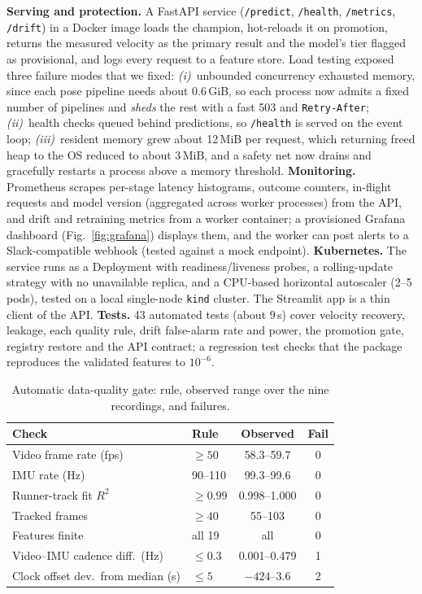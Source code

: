 \documentclass[conference]{IEEEtran}
\begin{document}
\textbf{Serving and protection.} A FastAPI service (\texttt{/predict}, \texttt{/health}, \texttt{/metrics}, \texttt{/drift}) in a Docker image loads the champion, hot-reloads it on promotion, returns the measured velocity as the primary result and the model's tier flagged as provisional, and logs every request to a feature store. Load testing exposed three failure modes that we fixed: \emph{(i)}~unbounded concurrency exhausted memory, since each pose pipeline needs about 0.6\,GiB, so each process now admits a fixed number of pipelines and \emph{sheds} the rest with a fast 503 and \texttt{Retry-After}; \emph{(ii)}~health checks queued behind predictions, so \texttt{/health} is served on the event loop; \emph{(iii)}~resident memory grew about 12\,MiB per request, which returning freed heap to the OS reduced to about 3\,MiB, and a safety net now drains and gracefully restarts a process above a memory threshold. \textbf{Monitoring.} Prometheus scrapes per-stage latency histograms, outcome counters, in-flight requests and model version (aggregated across worker processes) from the API, and drift and retraining metrics from a worker container; a provisioned Grafana dashboard (Fig.~\ref{fig:grafana}) displays them, and the worker can post alerts to a Slack-compatible webhook (tested against a mock endpoint). \textbf{Kubernetes.} The service runs as a Deployment with readiness/liveness probes, a rolling-update strategy with no unavailable replica, and a CPU-based horizontal autoscaler (2--5 pods), tested on a local single-node \texttt{kind} cluster. The Streamlit app is a thin client of the API.
\textbf{Tests.} 43 automated tests (about 9\,s) cover velocity recovery, leakage, each quality rule, drift false-alarm rate and power, the promotion gate, registry restore and the API contract; a regression test checks that the package reproduces the validated features to $10^{-6}$.

\begin{table}[t]
\caption{Automatic data-quality gate: rule, observed range over the nine recordings, and failures.}
\label{tab:qa}
\centering\footnotesize
\setlength{\tabcolsep}{3pt}
\begin{tabular}{@{}llcc@{}}
\toprule
Check & Rule & Observed & Fail\\
\midrule
Video frame rate (fps) & $\geq50$ & 58.3--59.7 & 0\\
IMU rate (Hz) & 90--110 & 99.3--99.6 & 0\\
Runner-track fit $R^2$ & $\geq0.99$ & 0.998--1.000 & 0\\
Tracked frames & $\geq40$ & 55--103 & 0\\
Features finite & all 19 & all & 0\\
Video--IMU cadence diff.\ (Hz) & $\leq0.3$ & 0.001--0.479 & 1\\
Clock offset dev.\ from median (s) & $\leq5$ & $-424$--3.6 & 2\\
\bottomrule
\end{tabular}
\end{table}
\end{document}
